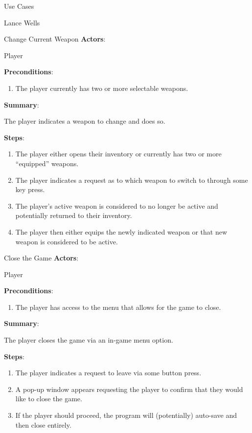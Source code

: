 \documentclass[12pt]{report}
\begin{document}
\begin{section}{Use Cases}
\begin{subsection}{Lance Wells}
\begin{subsubsection}{Change Current Weapon}
\textbf{Actors}:

Player

\textbf{Preconditions}:

\begin{enumerate}
\item The player currently has two or more selectable weapons.
\end{enumerate}

\textbf{Summary}:

The player indicates a weapon to change and does so.

\textbf{Steps}:

\begin{enumerate}
\item The player either opens their inventory or currently has two or more
``equipped'' weapons.
\item The player indicates a request as to which weapon to switch to through
some key press.
\item The player's active weapon is considered to no longer be active and
potentially returned to their inventory.
\item The player then either equips the newly indicated weapon or that new
weapon is considered to be active.
\end{enumerate}
\end{subsubsection}

\begin{subsubsection}{Close the Game}
\textbf{Actors}:

Player

\textbf{Preconditions}:

\begin{enumerate}
\item The player has access to the menu that allows for the game to close.
\end{enumerate}

\textbf{Summary}:

The player closes the game via an in-game menu option.

\textbf{Steps}:

\begin{enumerate}
\item The player indicates a request to leave via some button press.
\item A pop-up window appears requesting the player to confirm that they
would like to close the game.
\item If the player should proceed, the program will (potentially) auto-save
and then close entirely.
\end{enumerate}
\end{subsubsection}


\end{subsection}
\end{section}
\end{document}
